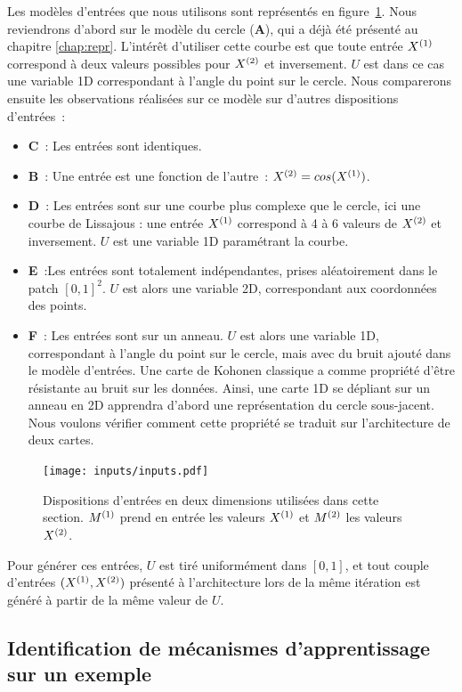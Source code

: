 \documentclass[../main]{subfiles}
\begin{document}
Les modèles d'entrées que nous utilisons sont représentés en figure~\ref{fig:input_list}.
Nous reviendrons d'abord sur le modèle du cercle (\textbf{A}), qui a déjà été présenté au chapitre \ref{chap:repr}. L'intérêt d'utiliser cette courbe est que toute entrée $X^{({1})}$ correspond à deux valeurs possibles pour $X^{({2})}$ et inversement. $U$ est dans ce cas une variable 1D correspondant à l'angle du point sur le cercle.
Nous comparerons ensuite les observations réalisées sur ce modèle sur d'autres dispositions d'entrées~:
\begin{itemize}
	\item \textbf{C}~: Les entrées sont identiques.
	\item \textbf{B}~: Une entrée est une fonction de l'autre~: $X^{({2})} = cos(X^{({1})})$.
	\item \textbf{D}~: Les entrées sont sur une courbe plus complexe que le cercle, ici une courbe de Lissajous : une entrée $X^{({1})}$ correspond à 4 à 6 valeurs de $X^{({2})}$ et inversement. $U$ est une variable 1D paramétrant la courbe.
	\item \textbf{E}~:Les entrées sont totalement indépendantes, prises aléatoirement dans le patch $[0,1]^2$. $U$ est alors une variable 2D, correspondant aux coordonnées des points.
	\item \textbf{F}~: Les entrées sont sur un anneau. $U$ est alors une variable 1D, correspondant à l'angle du point sur le cercle, mais avec du bruit ajouté dans le modèle d'entrées. 
	Une carte de Kohonen classique a comme propriété d'être résistante au bruit sur les données. Ainsi, une carte 1D se dépliant sur un anneau en 2D apprendra d'abord une représentation du cercle sous-jacent. Nous voulons vérifier comment cette propriété se traduit sur l'architecture de deux cartes.
\end{itemize}

\begin{figure}
	\texttt{[image: inputs/inputs.pdf]}
	\caption{Dispositions d'entrées en deux dimensions utilisées dans cette section. $M^{({1})}$ prend en entrée les valeurs $X^{({1})}$ et $M^{({2})}$ les valeurs $X^{({2})}$. \label{fig:input_list}}
\end{figure}

Pour générer ces entrées, $U$ est tiré uniformément dans $[0,1]$, et tout couple d'entrées $(X^{({1})},X^{({2})})$ présenté à l'architecture lors de la même itération est généré à partir de la même valeur de $U$.

\subsection{Identification de mécanismes d'apprentissage sur un exemple}\label{sec:2som_cercle}
\end{document}
